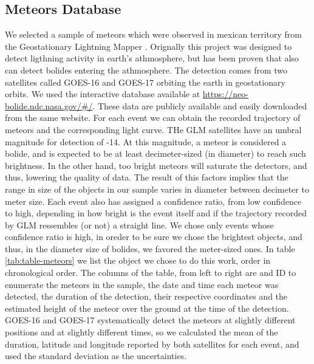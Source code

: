 \subsection{Meteors Database}

We selected a sample of meteors which were observed in mexican territory from the Geostationary Lightning Mapper \citep{GOODMAN:2013}. Orignally this project was designed to detect ligthning activity in earth's athmosphere, but has been proven that also can detect bolides entering the athmosphere. The detection comes from two satellites called GOES-16 and GOES-17 orbiting the earth in geostationary orbits. %
We used the interactive database available at \url{https://neo-bolide.ndc.nasa.gov/#/}. These data are publicly available and easily downloaded from the same website. For each event we can obtain the recorded trajectory of meteors and the corresponding light curve. THe GLM satellites have an umbral magnitude for detection of -14. At this magnitude, a meteor is considered a bolide, and is expected to be at least decimeter-sized (in diameter) to reach such brightness. In the other hand, too bright meteors will saturate the detectors, and thus, lowering the quality of data. The result of this factors implies that the range in size of the objects in our sample varies in diameter between decimeter to meter size. %
Each event also has assigned a confidence ratio, from low confidence to high, depending in how bright is the event itself and if the trajectory recorded by GLM ressembles (or not) a straight line. We chose only events whose confidence ratio is high, in oreder to be sure we chose the brightest objects, and thus, in the diameter size of bolides, we favored the meter-sized ones. In table \ref{tab:table-meteors} we list the object we chose to do this work, order in chronological order. The columns of the table, from left to right are and ID to enumerate the meteors in the sample, the date and time each meteor was detected, the duration of the detection, their respective coordinates and the estimated height of the meteor over the ground at the time of the detection. GOES-16 and GOES-17 systematically detect the meteors at slightly different positions and at slightly different times, so we calculated the mean of the duration, latitude and longitude reported by both satellites for each event, and used the standard deviation as the uncertainties.


